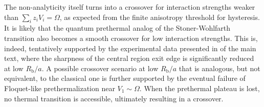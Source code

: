 \documentclass[english,floatfix,twocolumn,showpacs, aps, prx, reprint, superscriptaddress, longbibliography]{revtex4-2}
\begin{document}
The non-analyticity itself turns into a crossover for interaction strengths weaker than $\sum_i z_i V_i = \Omega$, as expected from the finite anisotropy threshold for hysteresis. It is likely that the quantum prethermal analog of the Stoner-Wohlfarth transition also becomes a smooth crossover for low interaction strengths. This is, indeed, tentatively supported by the experimental data presented in  of the main text, where the sharpness of the central region exit edge is significantly reduced at low $R_\mathrm{b}/a$. A possible crossover scenario at low $R_\mathrm{b}/a$ that is analogous, but not equivalent, to the classical one is further supported by the eventual failure of Floquet-like prethermalization near $V_1 \sim \Omega$. When the prethermal plateau is lost, no thermal transition is accessible, ultimately resulting in a crossover.



\end{document}
